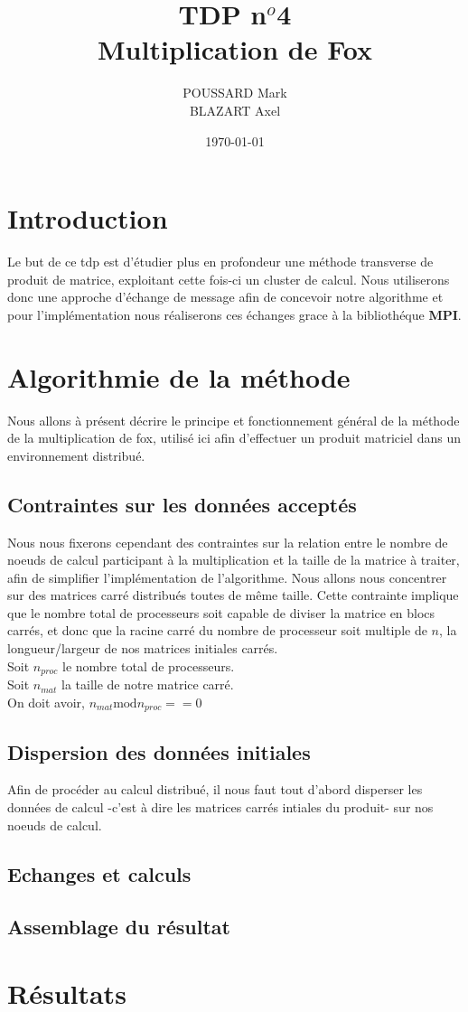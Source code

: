 \documentclass{article}
\title{TDP n$^o$4\\Multiplication de Fox}
\author{POUSSARD Mark \\ BLAZART Axel}
\date{\today}
\begin{document}
\maketitle

\section{Introduction}
Le but de ce tdp est d'étudier plus en profondeur une méthode transverse de produit de matrice, exploitant cette fois-ci un cluster de calcul. Nous utiliserons donc une approche d'échange de message afin de concevoir notre algorithme et pour l'implémentation nous réaliserons ces échanges grace à la bibliothéque \textbf{MPI}.

\section{Algorithmie de la méthode}
Nous allons à présent décrire le principe et fonctionnement général de la méthode de la multiplication de fox, utilisé ici afin d'effectuer un produit matriciel dans un environnement distribué.
\subsection{Contraintes sur les données acceptés}
Nous nous fixerons cependant des contraintes sur la relation entre le nombre de noeuds de calcul participant à la multiplication et la taille de la matrice à traiter, afin de simplifier l'implémentation de l'algorithme. Nous allons nous concentrer sur des matrices carré distribués toutes de même taille. Cette contrainte implique que le nombre total de processeurs soit capable de diviser la matrice en blocs carrés, et donc que la racine carré du nombre de processeur soit multiple de $n$, la longueur/largeur de nos matrices initiales carrés.\\
Soit $n_{proc}$ le nombre total de processeurs.\\
Soit $n_{mat}$ la taille de notre matrice carré.\\
On doit avoir, $n_{mat} \text{mod} n_{proc} == 0$
\subsection{Dispersion des données initiales}
Afin de procéder au calcul distribué, il nous faut tout d'abord disperser les données de calcul -c'est à dire les matrices carrés intiales du produit- sur nos noeuds de calcul.
\subsection{Echanges et calculs}
\subsection{Assemblage du résultat}

\section{Résultats}
\end{document}
